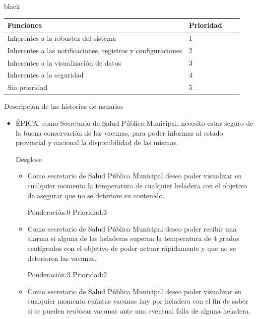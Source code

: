 \documentclass[11pt]{charter}
\begin{document}
\begin{consigna}{black}
\begin{table}[ht]
\begin{tabularx}{\linewidth}{@{}|l|X|X|l|@{}}
\hline
\rowcolor[HTML]{C0C0C0}
Funciones           & Prioridad 	\\ \hline
Inherentes a la robustez del sistema & 1 \\ \hline
Inherentes a las notificaciones, registros y configuraciones& 2 \\ \hline
Inherentes a la visualización de datos &3 \\ \hline
Inherentes a la seguridad & 4 \\ \hline
Sin prioridad & 5 \\ \hline
\end{tabularx}
\end{table}

Descripción de las historias de usuarios


\begin{itemize}
\item ÉPICA: como Secretario de Salud Pública Municipal, necesito estar seguro de la buena conservación de las vacunas, para poder informar al estado provincial y nacional la disponibilidad de las mismas.

Desglose
	\begin{itemize}
	\item 
    Como secretario de Salud Pública Municipal deseo poder visualizar en cualquier momento la temperatura de cualquier heladera con el objetivo de asegurar que no se deteriore su contenido. 
    
Ponderación:0 Prioridad:3
	\end{itemize}
	
	\begin{itemize}
	\item 
	Como secretario de Salud Pública Municipal deseo poder recibir una alarma si alguna de las heladeras superan la temperatura de 4 grados centígrados con el objetivo de poder actuar rápidamente y que no se deterioren las vacunas. 
	
Ponderación:3 Prioridad:2
	\end{itemize}

	\begin{itemize}
	\item 
	Como secretario de Salud Pública Municipal deseo poder visualizar en cualquier momento cuántas vacunas hay por heladera con el fin de saber si se pueden reubicar vacunas ante una eventual falla de alguna heladera. 


\end{itemize}
\end{itemize}
\end{consigna}
\end{document}
